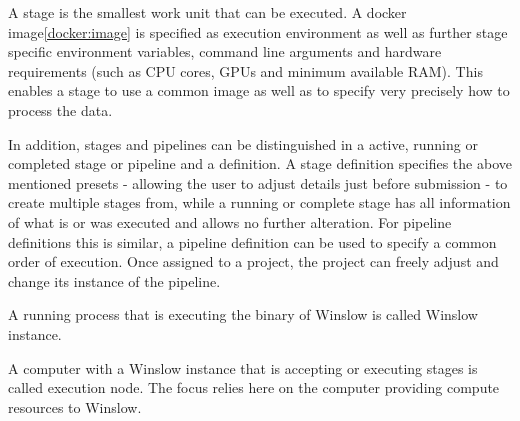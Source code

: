 A stage is the smallest work unit that can be executed.
A docker image\autoref{docker:image} is specified as execution environment as well as further stage specific environment variables, command line arguments and hardware requirements (such as CPU cores, GPUs and minimum available RAM).
This enables a stage to use a common image as well as to specify very precisely how to process the data.

In addition, stages and pipelines can be distinguished in a active, running or completed stage or pipeline and a definition.
A stage definition specifies the above mentioned presets - allowing the user to adjust details just before submission - to create multiple stages from, while a running or complete stage has all information of what is or was executed and allows no further alteration.
For pipeline definitions this is similar, a pipeline definition can be used to specify a common order of execution.
Once assigned to a project, the project can freely adjust and change its instance of the pipeline.

A running process that is executing the binary of Winslow is called Winslow instance.

A computer with a Winslow instance that is accepting or executing stages is called execution node.
The focus relies here on the computer providing compute resources to Winslow.

